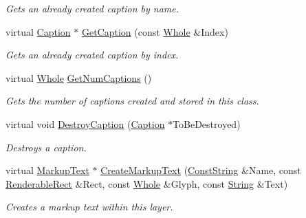 \begin{DoxyCompactItemize}
\begin{DoxyCompactList}\small\item\em Gets an already created caption by name. \item\end{DoxyCompactList}\item 
virtual \hyperlink{classphys_1_1UI_1_1Caption}{Caption} $\ast$ \hyperlink{classphys_1_1UI_1_1Layer_a78334cb4e75aaa559bfb76af31e2d0e0}{GetCaption} (const \hyperlink{namespacephys_a460f6bc24c8dd347b05e0366ae34f34a}{Whole} \&Index)
\begin{DoxyCompactList}\small\item\em Gets an already created caption by index. \item\end{DoxyCompactList}\item 
virtual \hyperlink{namespacephys_a460f6bc24c8dd347b05e0366ae34f34a}{Whole} \hyperlink{classphys_1_1UI_1_1Layer_a0e8df4319db95b3573c53b041686e66b}{GetNumCaptions} ()
\begin{DoxyCompactList}\small\item\em Gets the number of captions created and stored in this class. \item\end{DoxyCompactList}\item 
virtual void \hyperlink{classphys_1_1UI_1_1Layer_a62195d1732e1d200f0b847331ef6d3b0}{DestroyCaption} (\hyperlink{classphys_1_1UI_1_1Caption}{Caption} $\ast$ToBeDestroyed)
\begin{DoxyCompactList}\small\item\em Destroys a caption. \item\end{DoxyCompactList}\item 
virtual \hyperlink{classphys_1_1UI_1_1MarkupText}{MarkupText} $\ast$ \hyperlink{classphys_1_1UI_1_1Layer_a62338ca48dce418a53c4d9d027152a4c}{CreateMarkupText} (\hyperlink{namespacephys_a5ce5049f8b4bf88d6413c47b504ebb31}{ConstString} \&Name, const \hyperlink{structphys_1_1UI_1_1RenderableRect}{RenderableRect} \&Rect, const \hyperlink{namespacephys_a460f6bc24c8dd347b05e0366ae34f34a}{Whole} \&Glyph, const \hyperlink{namespacephys_aa03900411993de7fbfec4789bc1d392e}{String} \&Text)
\begin{DoxyCompactList}\small\item\em Creates a markup text within this layer. \item\end{DoxyCompactList}\item 

\end{DoxyCompactItemize}
